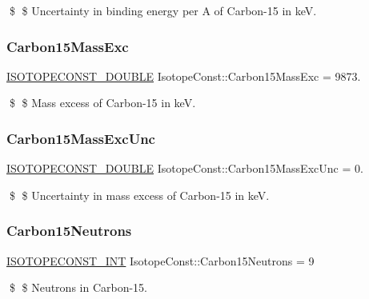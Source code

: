\$ \$ Uncertainty in binding energy per A of Carbon-\/15 in keV. \mbox{\label{group___isotope_const-_carbon-_c15_ga4de7dcb7b262f2ab5bb39089829a6c7e}} 
\subsubsection{\texorpdfstring{Carbon15\+Mass\+Exc}{Carbon15MassExc}}
{\footnotesize\ttfamily \mbox{\hyperlink{group___isotope_const-_macros_ga8f45a7272ce02c0b4c65c44636ed719a}{I\+S\+O\+T\+O\+P\+E\+C\+O\+N\+S\+T\+\_\+\+D\+O\+U\+B\+LE}} Isotope\+Const\+::\+Carbon15\+Mass\+Exc = 9873.}

\$ \$ Mass excess of Carbon-\/15 in keV. \mbox{\label{group___isotope_const-_carbon-_c15_ga9f5b52b0225f388f508471ff17416a71}} 
\subsubsection{\texorpdfstring{Carbon15\+Mass\+Exc\+Unc}{Carbon15MassExcUnc}}
{\footnotesize\ttfamily \mbox{\hyperlink{group___isotope_const-_macros_ga8f45a7272ce02c0b4c65c44636ed719a}{I\+S\+O\+T\+O\+P\+E\+C\+O\+N\+S\+T\+\_\+\+D\+O\+U\+B\+LE}} Isotope\+Const\+::\+Carbon15\+Mass\+Exc\+Unc = 0.}

\$ \$ Uncertainty in mass excess of Carbon-\/15 in keV. \mbox{\label{group___isotope_const-_carbon-_c15_ga91eb4948bc7bfe8bc62723004cc6c9ee}} 
\subsubsection{\texorpdfstring{Carbon15\+Neutrons}{Carbon15Neutrons}}
{\footnotesize\ttfamily \mbox{\hyperlink{group___isotope_const-_macros_ga5f18360b3e99483a35c32d789e62621c}{I\+S\+O\+T\+O\+P\+E\+C\+O\+N\+S\+T\+\_\+\+I\+NT}} Isotope\+Const\+::\+Carbon15\+Neutrons = 9}

\$ \$ Neutrons in Carbon-\/15. \mbox{\label{group___isotope_const-_carbon-_c15_ga19a6d12cd360578793b9399f1c361d91}} 
